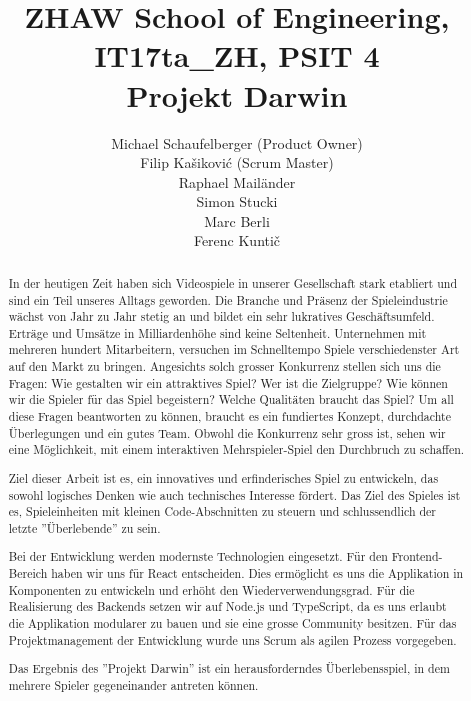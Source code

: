 \documentclass[11pt,a4paper,titlepage]{article}
\author{
Michael Schaufelberger (Product Owner)\\
Filip Kašiković (Scrum Master)\\
Raphael Mailänder\\
Simon Stucki\\
Marc Berli\\
Ferenc Kuntič}
\title{{\small ZHAW School of Engineering, 
IT17ta\_ZH, 
PSIT 4}\\
Projekt Darwin}
\begin{document}
\maketitle

\begin{otherlanguage}{english}
\begin{abstract}

In der heutigen Zeit haben sich Videospiele in unserer Gesellschaft stark etabliert und sind ein Teil unseres Alltags geworden. Die Branche und Präsenz der Spieleindustrie wächst von Jahr zu Jahr stetig an und bildet ein sehr lukratives Geschäftsumfeld. Erträge und Umsätze in Milliardenhöhe sind keine Seltenheit. Unternehmen mit mehreren hundert Mitarbeitern, versuchen im Schnelltempo Spiele verschiedenster Art auf den Markt zu bringen. 
Angesichts solch grosser Konkurrenz stellen sich uns die Fragen: Wie gestalten wir ein attraktives Spiel? Wer ist die Zielgruppe? Wie können wir die Spieler für das Spiel begeistern? Welche Qualitäten braucht das Spiel?
Um all diese Fragen beantworten zu können, braucht es ein fundiertes Konzept, durchdachte Überlegungen und ein gutes Team. Obwohl die Konkurrenz sehr gross ist, sehen wir eine Möglichkeit, mit einem interaktiven Mehrspieler-Spiel den Durchbruch zu schaffen.

Ziel dieser Arbeit ist es, ein innovatives und erfinderisches Spiel zu entwickeln, das sowohl logisches Denken wie auch technisches Interesse fördert. Das Ziel des Spieles ist es, Spieleinheiten mit kleinen Code-Abschnitten zu steuern und schlussendlich der letzte ''Überlebende'' zu sein.

Bei der Entwicklung werden modernste Technologien eingesetzt. Für den Frontend-Bereich haben wir uns für React entscheiden. Dies ermöglicht es uns die Applikation in Komponenten zu entwickeln und erhöht den Wiederverwendungsgrad. Für die Realisierung des Backends setzen wir auf Node.js und TypeScript, da es uns erlaubt die Applikation modularer zu bauen und sie eine grosse Community besitzen.
Für das Projektmanagement der Entwicklung wurde uns Scrum als agilen Prozess vorgegeben.

Das Ergebnis des ''Projekt Darwin'' ist ein herausforderndes Überlebensspiel, in dem mehrere Spieler gegeneinander antreten können.

\end{abstract}
\end{otherlanguage}
\end{document}
